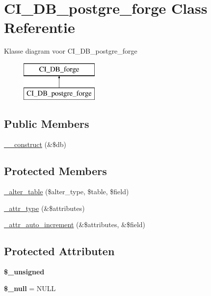 \hypertarget{class_c_i___d_b__postgre__forge}{}\section{C\+I\+\_\+\+D\+B\+\_\+postgre\+\_\+forge Class Referentie}
\label{class_c_i___d_b__postgre__forge}
Klasse diagram voor C\+I\+\_\+\+D\+B\+\_\+postgre\+\_\+forge\begin{figure}[H]
\begin{center}
\leavevmode
\includegraphics[height=2.000000cm]{class_c_i___d_b__postgre__forge}
\end{center}
\end{figure}
\subsection*{Public Members}
\begin{DoxyCompactItemize}
\item 
\mbox{\hyperlink{class_c_i___d_b__postgre__forge_aaf2ef772755ec6f361d44e16cc9ffd69}{\+\_\+\+\_\+construct}} (\&\$db)
\end{DoxyCompactItemize}
\subsection*{Protected Members}
\begin{DoxyCompactItemize}
\item 
\mbox{\hyperlink{class_c_i___d_b__postgre__forge_a41c6cae02f2fda8b429ad0afb9509426}{\+\_\+alter\+\_\+table}} (\$alter\+\_\+type, \$table, \$field)
\item 
\mbox{\hyperlink{class_c_i___d_b__postgre__forge_a8553be952084c6f7cdfff370a1d14f6b}{\+\_\+attr\+\_\+type}} (\&\$attributes)
\item 
\mbox{\hyperlink{class_c_i___d_b__postgre__forge_a2a013a5932439c3c44f0dad3436525f7}{\+\_\+attr\+\_\+auto\+\_\+increment}} (\&\$attributes, \&\$field)
\end{DoxyCompactItemize}
\subsection*{Protected Attributen}
\begin{DoxyCompactItemize}
\item 
{\bfseries \$\+\_\+unsigned}
\item 
\mbox{\label{class_c_i___d_b__postgre__forge_ae58fe6a5104d4a069a49b27533ce808f}} 
{\bfseries \$\+\_\+null} = \textquotesingle{}N\+U\+LL\textquotesingle{}
\end{DoxyCompactItemize}

